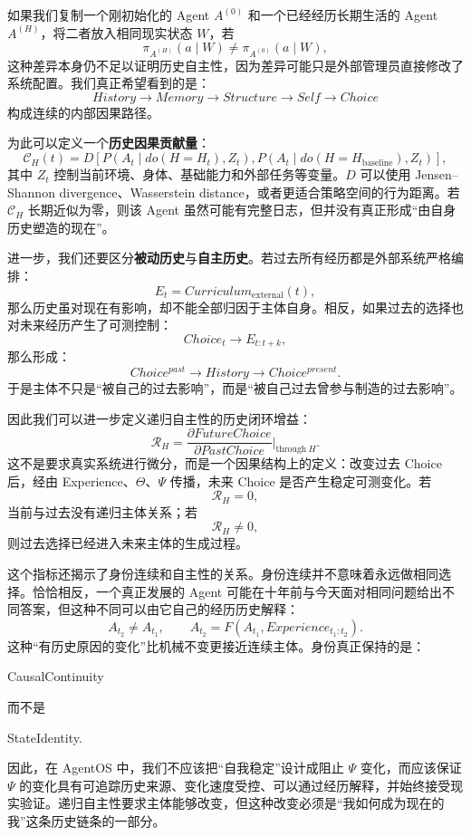 如果我们复制一个刚初始化的 Agent $A^{(0)}$ 和一个已经经历长期生活的 Agent $A^{(H)}$，将二者放入相同现实状态 $W$，若
\[
\pi_{A^{(H)}}(a\mid W)
\neq
\pi_{A^{(0)}}(a\mid W),
\]
这种差异本身仍不足以证明历史自主性，因为差异可能只是外部管理员直接修改了系统配置。我们真正希望看到的是：
\[
History
\rightarrow
Memory
\rightarrow
Structure
\rightarrow
Self
\rightarrow
Choice
\]
构成连续的内部因果路径。

为此可以定义一个\textbf{历史因果贡献量}：
\[
\mathcal C_H(t)
=
D
\left[
P(A_t\mid do(H=H_t),Z_t),
P(A_t\mid do(H=H_{\mathrm{baseline}}),Z_t)
\right],
\]
其中 $Z_t$ 控制当前环境、身体、基础能力和外部任务等变量。$D$ 可以使用 Jensen--Shannon divergence、Wasserstein distance，或者更适合策略空间的行为距离。若 $\mathcal C_H$ 长期近似为零，则该 Agent 虽然可能有完整日志，但并没有真正形成“由自身历史塑造的现在”。

进一步，我们还要区分\textbf{被动历史}与\textbf{自主历史}。若过去所有经历都是外部系统严格编排：
\[
E_t
=
Curriculum_{\mathrm{external}}(t),
\]
那么历史虽对现在有影响，却不能全部归因于主体自身。相反，如果过去的选择也对未来经历产生了可测控制：
\[
Choice_t
\rightarrow
E_{t:t+k},
\]
那么形成：
\[
Choice^{past}
\rightarrow
History
\rightarrow
Choice^{present}.
\]
于是主体不只是“被自己的过去影响”，而是“被自己过去曾参与制造的过去影响”。

因此我们可以进一步定义递归自主性的历史闭环增益：
\[
\mathcal R_H
=
\frac{
\partial FutureChoice
}{
\partial PastChoice
}
\Bigg|_{\mathrm{through}\ H}.
\]
这不是要求真实系统进行微分，而是一个因果结构上的定义：改变过去 Choice 后，经由 Experience、$\Theta$、$\Psi$ 传播，未来 Choice 是否产生稳定可测变化。若
\[
\mathcal R_H=0,
\]
当前与过去没有递归主体关系；若
\[
\mathcal R_H\neq0,
\]
则过去选择已经进入未来主体的生成过程。

这个指标还揭示了身份连续和自主性的关系。身份连续并不意味着永远做相同选择。恰恰相反，一个真正发展的 Agent 可能在十年前与今天面对相同问题给出不同答案，但这种不同可以由它自己的经历历史解释：
\[
A_{t_2}
\neq
A_{t_1},
\qquad
A_{t_2}
=
F(A_{t_1},Experience_{t_1:t_2}).
\]
这种“有历史原因的变化”比机械不变更接近连续主体。身份真正保持的是：
\begin{statementbox}
CausalContinuity
\end{statementbox}
而不是
\begin{statementbox}
StateIdentity.
\end{statementbox}

因此，在 AgentOS 中，我们不应该把“自我稳定”设计成阻止 $\Psi$ 变化，而应该保证 $\Psi$ 的变化具有可追踪历史来源、变化速度受控、可以通过经历解释，并始终接受现实验证。递归自主性要求主体能够改变，但这种改变必须是“我如何成为现在的我”这条历史链条的一部分。


